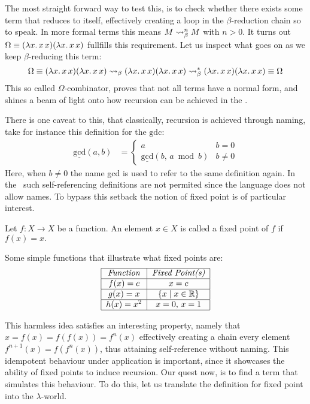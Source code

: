 \documentclass[12pt]{book}
\begin{document}
The most straight forward way to test this, is to check whether there exists some term that reduces to itself, effectively creating a loop in the $\beta$-reduction chain so to speak. In more formal terms this means \( M \mathrel{\leadsto}_\beta^n M \) with $ n > 0 $. It turns out \( \Omega \equiv (\lambda x . \, x \, x) (\lambda x . \, x \, x) \) fullfills this requirement. Let us inspect what goes on as we keep $\beta$-reducing this term:
\[
  \Omega \equiv (\lambda x . \, x \, x) (\lambda x . \, x \, x) \mathrel{\leadsto}_\beta (\lambda x . \, x \, x) (\lambda x . \, x \, x) \mathrel{\leadsto}_\beta^* (\lambda x . \, x \, x) (\lambda x . \, x \, x) \equiv \Omega
\]
This so called $\Omega$-combinator, proves that not all terms have a normal form, and shines a beam of light onto how recursion can be achieved in the \lcalc.

There is one caveat to this, that classically, recursion is achieved through naming, take for instance this definition for the $\mathrm{gdc}$:
\begin{align*}
  \underline{\mathrm{gcd}}(a,b) &= 
                      \begin{cases}
                        a & b = 0 \\
                        \underline{\mathrm{gcd}}(b,\, a \bmod b) & b \neq 0
                      \end{cases}
\end{align*}
Here, when $b \neq 0$ the name gcd is used to refer to the same definition again. In the \lcalc \ such self-referencing definitions are not permited since the language does not allow names. To bypass this setback the notion of fixed point is of particular interest.
\begin{definition}
  Let \( f : X \to X \) be a function. An element \( x \in X \) is called a fixed point of \( f \) if \( f(x) = x. \)
\end{definition}
\begin{example} Some simple functions that illustrate what fixed points are:
  \[
    \begin{tabular}{|c|c|}
      \hline
      \textit{Function} & \textit{Fixed Point(s)} \\
      \hline
      $f(x) = c$ & $x = c$ \\
      \hline
      $g(x) = x$ & $\{ x \mid x \in \mathbb{R} \}$ \\
      \hline
      $h(x) = x^2$ & $ x = 0,\, x = 1 $ \\
      \hline
    \end{tabular}
  \]
\end{example}
This harmless idea satisfies an interesting property, namely that $ x = f(x) = f(f(x)) = f^n(x) $ effectively creating a chain every element $ f^{n+1}(x) = f(f^{n}(x))$, thus attaining self-reference without naming. This idempotent behaviour under application is important, since it showcases the ability of fixed points to induce recursion. Our quest now, is to find a term that simulates this behaviour. To do this, let us translate the definition for fixed point into the $\lambda$-world.
\end{document}
